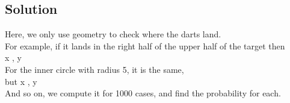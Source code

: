 \documentclass{article}
\begin{document}
    \subsection{Solution}

    Here, we only use geometry to check where the darts land.\\
    For example, if it lands in the right half of the upper half of the target
    then\\ x \in [0, 10], y \in [0, \(\sqrt{10^2 - x^2}\)]\\
    For the inner circle with radius 5, it is the same, \\but x \in [-5, 5],
    y \in [0, \(\sqrt{5^2 - x^2}\)]\\
    And so on, we compute it for 1000 cases, and find the probability for each.
\end{document}
